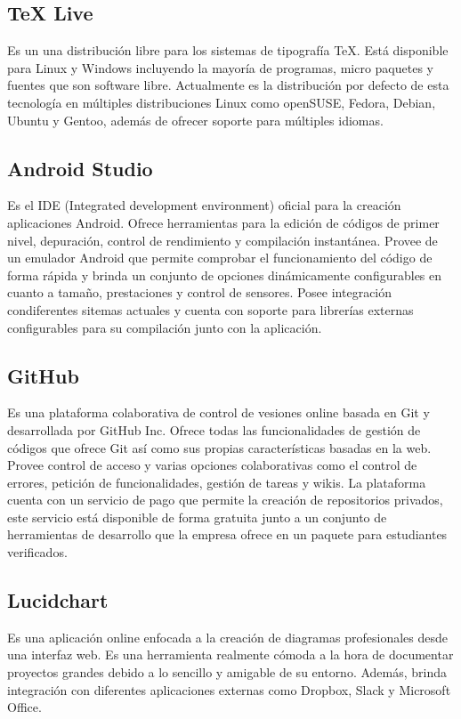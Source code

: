 \documentclass[12pt]{article}
\begin{document}
    \subsection{TeX Live}
        Es un una distribución libre para los sistemas de tipografía TeX. Está disponible para Linux y Windows incluyendo la mayoría de programas, micro paquetes y fuentes que son software libre. Actualmente es la distribución por defecto de esta tecnología en múltiples distribuciones Linux como openSUSE, Fedora, Debian, Ubuntu y Gentoo, además de ofrecer soporte para múltiples idiomas.

    \subsection{Android Studio}
        Es el IDE (Integrated development environment) oficial para la creación aplicaciones Android. Ofrece herramientas para la edición de códigos de primer nivel, depuración, control de rendimiento y compilación instantánea. Provee de un emulador Android que permite comprobar el funcionamiento del código de forma rápida y brinda un conjunto de opciones dinámicamente configurables en cuanto a tamaño, prestaciones y control de sensores. Posee integración condiferentes sitemas actuales y cuenta con soporte para librerías externas configurables para su compilación junto con la aplicación.

    \subsection{GitHub}
        Es una plataforma colaborativa de control de vesiones online basada en Git y desarrollada por GitHub Inc. Ofrece todas las funcionalidades de gestión de códigos que ofrece Git así como sus propias características basadas en la web. Provee control de acceso y varias opciones colaborativas como el control de errores, petición de funcionalidades, gestión de tareas y wikis. La plataforma cuenta con un servicio de pago que permite la creación de repositorios privados, este servicio está disponible de forma gratuita junto a un conjunto de herramientas de desarrollo que la empresa ofrece en un paquete para estudiantes verificados.

    \subsection{Lucidchart}
        Es una aplicación online enfocada a la creación de diagramas profesionales desde una interfaz web. Es una herramienta realmente cómoda a la hora de documentar proyectos grandes debido a lo sencillo y amigable de su entorno. Además, brinda integración con diferentes aplicaciones externas como Dropbox, Slack y Microsoft Office. 
\end{document}
